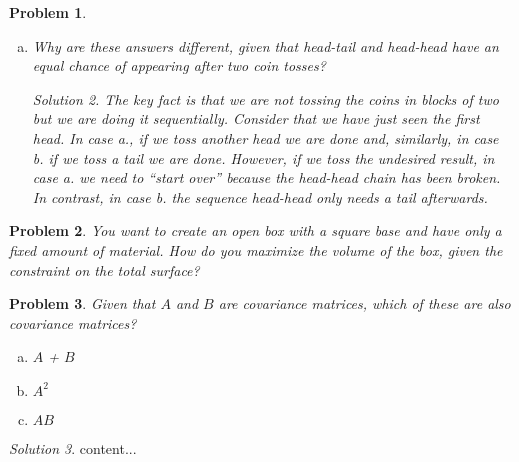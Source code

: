 \documentclass[12pt, letterpaper]{amsart}
\numberwithin{equation}{section} %
\newtheorem{problem}{Problem}
\theoremstyle{definition}
\theoremstyle{remark}
\newtheorem*{solution}{Solution}
\begin{document}
\begin{problem}
\begin{enumerate}[a.]
\begin{solution}
which gives 4 tosses for a fair coin.
\end{solution}
\item Why are these answers different, given that head-tail and head-head have an equal chance of appearing after two coin tosses?
\begin{solution}
The key fact is that we are not tossing the coins in blocks of two but we are doing it sequentially. Consider that we have just seen the first head. In case a., if we toss another head we are done and, similarly, in case b. if we toss a tail we are done. However, if we toss the undesired result, in case a. we need to ``start over'' because the head-head chain has been broken. In contrast, in case b. the sequence head-head only needs a tail afterwards. 
\end{solution}
\end{enumerate}
\end{problem}


\begin{problem}
You want to create an open box with a square base and have only a fixed amount of material. How do you maximize the volume of the box, given the constraint on the total surface?
\end{problem}


\begin{problem}
Given that $A$ and $B$ are covariance matrices, which of these are also covariance matrices?
\begin{enumerate}[a.]
\item $A$ + $B$
\item $A^2$
\item $AB$
\end{enumerate}
\end{problem}
\begin{solution}
content...
\end{solution}
\end{document}
